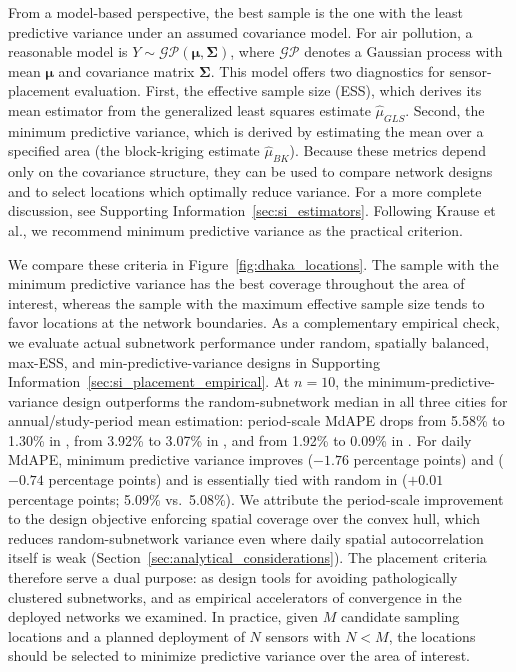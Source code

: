 \documentclass[12pt]{article}
\theoremstyle{remark}
\newcommand{\city}[1]{\capitalisewords{\MakeLowercase{#1}}}
\begin{document}
From a model-based perspective, the best sample is the one with the least predictive variance under an assumed covariance model. For air pollution, a reasonable model is $Y \sim \mathcal{GP}(\bm{\mu}, \bm{\Sigma})$, where $\mathcal{GP}$ denotes a Gaussian process with mean $\bm{\mu}$ and covariance matrix $\bm{\Sigma}$. This model offers two diagnostics for sensor-placement evaluation. First, the effective sample size (ESS), which derives its mean estimator from the generalized least squares estimate $\hat{\mu}_{GLS}$. Second, the minimum predictive variance, which is derived by estimating the mean over a specified area (the block-kriging estimate $\hat{\mu}_{BK}$). Because these metrics depend only on the covariance structure, they can be used to compare network designs and to select locations which optimally reduce variance. For a more complete discussion, see Supporting Information~\ref{sec:si_estimators}. Following Krause et al.\supercite{krause2008near,guestrin2005near}, we recommend minimum predictive variance as the practical criterion.

We compare these criteria in Figure~\ref{fig:dhaka_locations}. The sample with the minimum predictive variance has the best coverage throughout the area of interest, whereas the sample with the maximum effective sample size tends to favor locations at the network boundaries. As a complementary empirical check, we evaluate actual subnetwork performance under random, spatially balanced, max-ESS, and min-predictive-variance designs in Supporting Information~\ref{sec:si_placement_empirical}. At $n=10$, the minimum-predictive-variance design outperforms the random-subnetwork median in all three cities for annual/study-period mean estimation: period-scale MdAPE drops from 5.58\% to 1.30\% in \city{Lucknow}, from 3.92\% to 3.07\% in \city{Dhaka}, and from 1.92\% to 0.09\% in \city{Chicago}. For daily MdAPE, minimum predictive variance improves \city{Dhaka} ($-1.76$ percentage points) and \city{Chicago} ($-0.74$ percentage points) and is essentially tied with random in \city{Lucknow} ($+0.01$ percentage points; 5.09\% vs.\ 5.08\%). We attribute the period-scale improvement to the design objective enforcing spatial coverage over the convex hull, which reduces random-subnetwork variance even where daily spatial autocorrelation itself is weak (Section~\ref{sec:analytical_considerations}). The placement criteria therefore serve a dual purpose: as design tools for avoiding pathologically clustered subnetworks, and as empirical accelerators of convergence in the deployed networks we examined. In practice, given $M$ candidate sampling locations and a planned deployment of $N$ sensors with $N < M$, the locations should be selected to minimize predictive variance over the area of interest.
\end{document}
